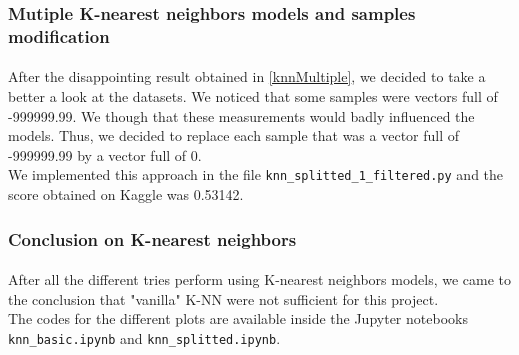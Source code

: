 \documentclass[a4paper, 11pt, oneside]{article}
\begin{document}
\subsubsection{Mutiple K-nearest neighbors models and samples modification}
\paragraph{}After the disappointing result obtained in \ref{knnMultiple}, we decided to take a better a look at the datasets. We noticed that some samples were vectors full of -999999.99. We though that these measurements would badly influenced the models. Thus, we decided to replace each sample that was a vector full of -999999.99 by a vector full of 0.\\
We implemented this approach in the file \texttt{knn\_splitted\_1\_filtered.py} and the score obtained on Kaggle was 0.53142.

\subsubsection{Conclusion on K-nearest neighbors}
\paragraph{}After all the different tries perform using K-nearest neighbors models, we came to the conclusion that "vanilla" K-NN were not sufficient for this project.\\
The codes for the different plots are available inside the Jupyter notebooks \texttt{knn\_basic.ipynb} and \texttt{knn\_splitted.ipynb}.

\end{document}
